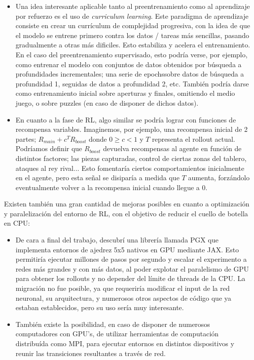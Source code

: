 \documentclass[12pt, a4paper]{article}
\begin{document}
\begin{itemize}
    \item Una idea interesante aplicable tanto al preentrenamiento como al aprendizaje por refuerzo es el uso de \textit{curriculum learning}. Este paradigma de aprendizaje consiste en crear un currículum de complejidad progresiva, con la idea de que el modelo se entrene primero contra los datos / tareas más sencillas, pasando gradualmente a otras más dificiles. Esto estabiliza y acelera el entrenamiento. En el caso del preentrenamiento supervisado, esto podría verse, por ejemplo, como entrenar el modelo con conjuntos de datos obtenidos por búsqueda a profundidades incrementales; una serie de epochssobre datos de búsqueda a profundidad 1, seguidas de datos a profundidad 2, etc. También podría darse como entrenamiento inicial sobre aperturas y finales, omitiendo el medio juego, o sobre puzzles (en caso de disponer de dichos datos).
    \item En cuanto a la fase de RL, algo similar se podría lograr con funciones de recompensa variables. Imaginemos, por ejemplo, una recompensa inicial de 2 partes; $R_{main} + c^T R_{boost}$  donde $0 \geq c < 1$ y $T$ representa el rollout actual. Podríamos definir que $R_{boost}$ devuelva recompensas al agente en función de distintos factores; las piezas capturadas, control de ciertas zonas del tablero, ataques al rey rival... Esto fomentaría ciertos comportamientos inicialmente en el agente, pero esta señal se disiparía a medida que $T$ aumenta, forzándolo eventualmente volver a la recompensa inicial cuando llegue a 0. 

\end{itemize}

Existen también una gran cantidad de mejoras posibles en cuanto a optimización y paralelización del entorno de RL, con el objetivo de reducir el cuello de botella en CPU:

\begin{itemize}
    \item De cara a final del trabajo, descubrí una librería llamada PGX que implementa entornos de ajedrez 5x5 nativos en GPU mediante JAX. Esto permitiría ejecutar millones de pasos por segundo y escalar el experimento a redes más grandes y con más datos, al poder explotar el paralelismo de GPU para obtener los rollouts y no depender del límite de threads de la CPU. La migración no fue posible, ya que requeriría modificar el input de la red neuronal, su arquitectura, y numerosos otros aspectos de código que ya estaban establecidos, pero su uso sería muy interesante.
    \item También existe la posibilidad, en caso de disponer de numerosos computadores con GPU's, de utilizar herramientas de computación distribuída como MPI, para ejecutar entornos en distintos dispositivos y reunir las transiciones resultantes a través de red.
\end{itemize}
\end{document}
